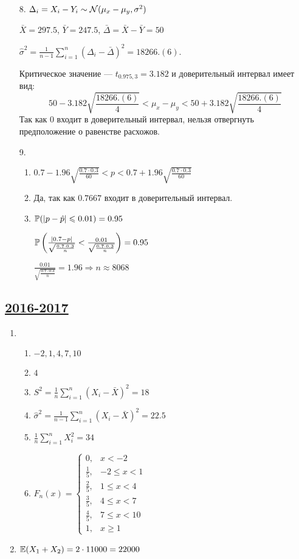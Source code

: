 \begin{enumerate}[resume]
\begin{enumerate}
\begin{enumerate}
\end{enumerate}
\item[8.] $\Delta_i = X_i - Y_i \sim \cN(\mu_x - \mu_y, \sigma^2)$

$\bar X = 297.5$, $\bar Y = 247.5$, $\bar \Delta = \bar X - \bar Y = 50$

$\hat \sigma^2 = \frac{1}{n-1} \sum_{i=1}^n (\Delta_i - \bar \Delta)^2 = 18266.(6)$.

Критическое значение — $t_{0.975, 3} = 3.182$ и доверительный интервал имеет вид:
\[
50 - 3.182 \sqrt{\frac{18266.(6)}{4}} < \mu_x - \mu_y < 50 + 3.182 \sqrt{\frac{18266.(6)}{4}}
\]
Так как $0$ входит в доверительный интервал, нельзя отвергнуть предположение о равенстве расхожов.
\item[9.]
\begin{enumerate}
\item $0.7 - 1.96 \sqrt{\frac{0.7 \cdot 0.3}{60}} < p < 0.7 + 1.96 \sqrt{\frac{0.7 \cdot 0.3}{60}} $
\item Да, так как $0.7667$ входит в доверительный интервал.
\item $\P(|p - \hat p| \leq 0.01) = 0.95$

$\P\left(\frac{|0.7 - p|}{\sqrt{\frac{0.7 \cdot 0.3}{n}}} < \frac{0.01}{\sqrt{\frac{0.7 \cdot 0.3}{n}}} \right) = 0.95$

$\frac{0.01}{\sqrt{\frac{0.7 \cdot 0.3}{n}}} = 1.96 \Rightarrow n \approx 8068$
\end{enumerate}
\end{enumerate}


\subsection[2016-2017]{\hyperref[sec:kr_03_2016_2017]{2016-2017}}
\label{sec:sol_kr_03_2016_2017}


\begin{enumerate}
\item
\begin{enumerate}
\item $-2, 1, 4, 7, 10$
\item $4$
\item $S^2 = \frac{1}{n} \sum_{i=1}^n (X_i - \bar{X})^2 = 18$
\item $\hat\sigma^2 = \frac{1}{n-1} \sum_{i=1}^n (X_i - \bar{X})^2 = 22.5$
\item $\frac{1}{n} \sum_{i=1}^n X_i^2 = 34$
\item $F_n(x) = \begin{cases}
0, & x < -2 \\
\frac{1}{5}, & -2 \leq x < 1 \\
\frac{2}{5}, & 1 \leq x < 4 \\
\frac{3}{5}, & 4 \leq x < 7 \\
\frac{4}{5}, & 7 \leq x < 10 \\
1, & x \geq 1
\end{cases}$
\end{enumerate}
\item $\E(X_1 + X_2) = 2 \cdot 11000 = 22000$


\end{enumerate}
\end{enumerate}
